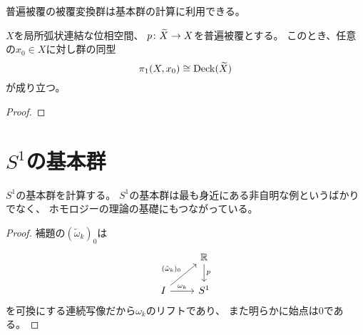\documentclass[report]{jlreq}
\begin{document}
普遍被覆の被覆変換群は基本群の計算に利用できる。

\begin{theorem}[普遍被覆の被覆変換群と基本群]
    $X$を局所弧状連結な位相空間、
    $p \colon \widetilde{X} \to X$を普遍被覆とする。
    このとき、任意の$x_0 \in X$に対し群の同型
    \begin{equation}
        \pi_1(X, x_0) \cong \operatorname{Deck}(\widetilde{X})
    \end{equation}
    が成り立つ。
\end{theorem}

\begin{proof}
    \TODO{}
\end{proof}


%
\section{
    \texorpdfstring{%
        $S^1$の基本群%
    }{%
        S1の基本群%
    }%
}

$S^1$の基本群を計算する。
$S^1$の基本群は最も身近にある非自明な例というばかりでなく、
ホモロジーの理論の基礎にもつながっている。


\begin{proof}
    補題の$(\tilde{\omega}_k)_0$は
    \begin{equation}
        \begin{tikzcd}
            & \R
                \ar{d}{p} \\
            I
                \ar{ur}{(\tilde{\omega}_k)_0}
                \ar{r}{\omega_k}
                & S^1
        \end{tikzcd}
    \end{equation}
    を可換にする連続写像だから$\omega_k$のリフトであり、
    また明らかに始点は$0$である。
\end{proof}
\end{document}
